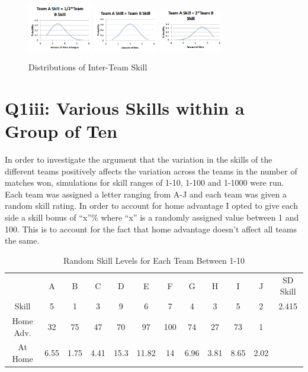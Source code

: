 \documentclass[12pt]{article}
\begin{document}
\begin{figure}[h]
\centering
\includegraphics[width=0.25\textwidth]{skill_a_half_skill_b.png}
\includegraphics[width=0.25\textwidth]{skill_a_equals_skill_b.png}
\includegraphics[width=0.25\textwidth]{skill_a_2x_skill_b.png}
\caption{Distributions of Inter-Team Skill}
\end{figure}

\section{Q1iii: Various Skills within a Group of Ten}
In order to investigate the argument that the variation in the skills of the different teams positively affects the variation across the teams in the number of matches won, simulations for skill ranges of 1-10, 1-100 and 1-1000 were run. Each team was assigned a letter ranging from A-J and each team was given a random skill rating. In order to account for home advantage I opted to give each side a skill bonus of “x”\% where “x” is a randomly assigned value between 1 and 100. This is to account for the fact that home advantage doesn’t affect all teams the same.

\begin{table}[h]
\centering
\begin{tabular}{cccccccccccc}
          & A    & B    & C    & D    & E     & F   & G    & H    & I    & J    & SD Skill \\
Skill     & 5    & 1    & 3    & 9    & 6     & 7   & 4    & 3    & 5    & 2    & 2.415    \\
Home Adv. & 32   & 75   & 47   & 70   & 97    & 100 & 74   & 27   & 73   & 1    &          \\
At Home   & 6.55 & 1.75 & 4.41 & 15.3 & 11.82 & 14  & 6.96 & 3.81 & 8.65 & 2.02 &         
\end{tabular}
\caption{Random Skill Levels for Each Team Between 1-10}
\end{table}
\end{document}
